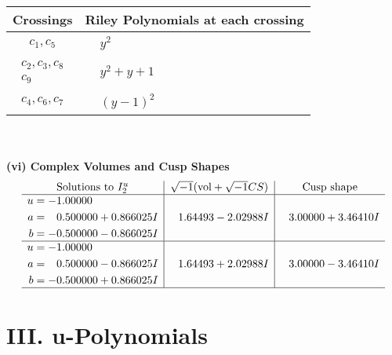 \documentclass[1p]{elsarticle_modified}
\theoremstyle{definition}
\newcommand{\I}{\sqrt{-1}}
\begin{document}
\begin{tabular}{m{50pt}|m{274pt}}
Crossings & \hspace{64pt}Riley Polynomials at each crossing \\
\hline $$\begin{aligned}c_{1},c_{5}\end{aligned}$$&$\begin{aligned}
&y^2
\end{aligned}$\\
\hline $$\begin{aligned}c_{2},c_{3},c_{8}\\c_{9}\end{aligned}$$&$\begin{aligned}
&y^2+y+1
\end{aligned}$\\
\hline $$\begin{aligned}c_{4},c_{6},c_{7}\end{aligned}$$&$\begin{aligned}
&(y-1)^2
\end{aligned}$\\
\hline
\end{tabular}\\~\\
\newpage\flushleft \textbf{(vi) Complex Volumes and Cusp Shapes}
$$\begin{array}{c|c|c}  
\text{Solutions to }I^u_{2}& \I (\text{vol} + \sqrt{-1}CS) & \text{Cusp shape}\\
 \hline 
\begin{aligned}
u &= -1.00000\phantom{ +0.000000I} \\
a &= \phantom{-}0.500000 + 0.866025 I \\
b &= -0.500000 - 0.866025 I\end{aligned}
 & \phantom{-}1.64493 - 2.02988 I & \phantom{-}3.00000 + 3.46410 I \\ \hline\begin{aligned}
u &= -1.00000\phantom{ +0.000000I} \\
a &= \phantom{-}0.500000 - 0.866025 I \\
b &= -0.500000 + 0.866025 I\end{aligned}
 & \phantom{-}1.64493 + 2.02988 I & \phantom{-}3.00000 - 3.46410 I\\
 \hline 
 \end{array}$$\newpage
\newpage\renewcommand{\arraystretch}{1}
\centering \section*{ III. u-Polynomials}
\end{document}
